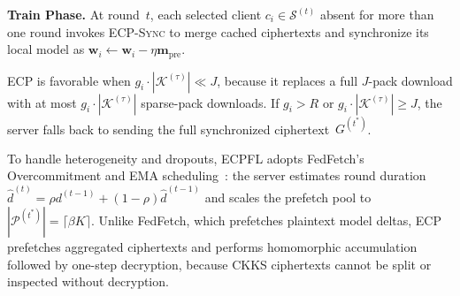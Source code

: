 \textbf{Train Phase.}
At round~$t$, each selected client $c_i \in \mathcal{S}^{(t)}$ absent for more than one round invokes \textsc{ECP-Sync} to merge cached ciphertexts and synchronize its local model as $\mathbf{w}_i\leftarrow\mathbf{w}_i-\eta\mathbf{m}_{\mathrm{pre}}$.

ECP is favorable when $g_i\cdot|\mathcal{K}^{(\tau)}|\ll J$, because it replaces a full $J$-pack download with at most $g_i\cdot|\mathcal{K}^{(\tau)}|$ sparse-pack downloads.
If $g_i>R$ or $g_i\cdot|\mathcal{K}^{(\tau)}|\ge J$, the server falls back to sending the full synchronized ciphertext~$G^{(t^*)}$.

To handle heterogeneity and dropouts, \textsc{ECPFL} adopts FedFetch's Overcommitment and EMA scheduling~\cite{yan2025fedfetch}: the server estimates round duration $\hat{d}^{(t)}=\rho d^{(t-1)}+(1-\rho)\hat{d}^{(t-1)}$ and scales the prefetch pool to $|\mathcal{P}^{(t^*)}|=\lceil\beta K\rceil$.
Unlike FedFetch, which prefetches plaintext model deltas, ECP prefetches aggregated ciphertexts and performs homomorphic accumulation followed by one-step decryption, because CKKS ciphertexts cannot be split or inspected without decryption.

\begin{algorithm}[t]
\caption{\textsc{ECP} Download Module}
\label{alg:download}
\small
{}




\end{algorithm}

